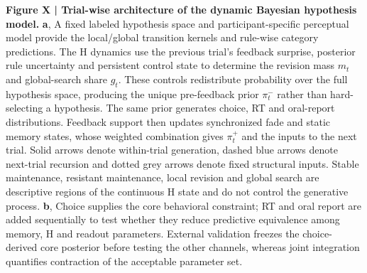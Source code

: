 \textbf{Figure X | Trial-wise architecture of the dynamic Bayesian hypothesis model.}
\textbf{a}, A fixed labeled hypothesis space and participant-specific perceptual model provide the local/global transition kernels and rule-wise category predictions. The H dynamics use the previous trial's feedback surprise, posterior rule uncertainty and persistent control state to determine the revision mass $m_t$ and global-search share $g_t$. These controls redistribute probability over the full hypothesis space, producing the unique pre-feedback prior $\pi^-_t$ rather than hard-selecting a hypothesis. The same prior generates choice, RT and oral-report distributions. Feedback support then updates synchronized fade and static memory states, whose weighted combination gives $\pi^+_t$ and the inputs to the next trial. Solid arrows denote within-trial generation, dashed blue arrows denote next-trial recursion and dotted grey arrows denote fixed structural inputs. Stable maintenance, resistant maintenance, local revision and global search are descriptive regions of the continuous H state and do not control the generative process. \textbf{b}, Choice supplies the core behavioral constraint; RT and oral report are added sequentially to test whether they reduce predictive equivalence among memory, H and readout parameters. External validation freezes the choice-derived core posterior before testing the other channels, whereas joint integration quantifies contraction of the acceptable parameter set.

